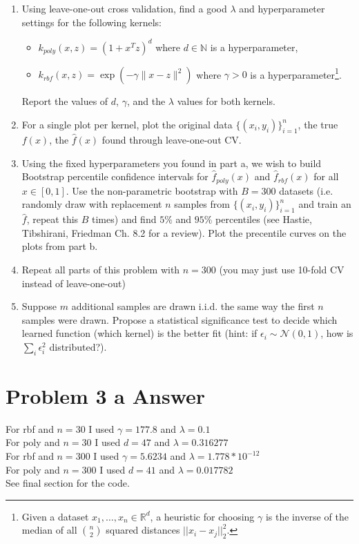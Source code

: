 \documentclass{article}
\newcommand{\field}[1]{\mathbb{#1}}
\newcommand{\1}{\mathbf{1}}
\newcommand{\R}{\field{R}} %
\begin{document}
\begin{enumerate}
  \item Using leave-one-out cross validation, find a good $\lambda$ and hyperparameter settings for the following kernels:
  \begin{itemize}
    \item $k_{poly}(x,z) = (1+x^Tz)^d$ where $d \in \mathbb{N}$ is a hyperparameter, 
    \item $k_{rbf}(x,z) = \exp(-\gamma \|x-z\|^2)$ where $\gamma > 0$ is a hyperparameter\footnote{Given a dataset $x_1,\dots,x_n \in \R^d$, a heuristic for choosing $\gamma$ is the inverse of the median of all $\binom{n}{2}$ squared distances $||x_i-x_j||_2^2$.}.
  \end{itemize} 
Report the values of $d$, $\gamma$, and the $\lambda$ values for both kernels.
  \item For a single plot per kernel, plot the original data $\{(x_i,y_i)\}_{i=1}^n$, the true $f(x)$, the $\widehat{f}(x)$ found through leave-one-out CV.
  \item Using the fixed hyperparameters you found in part a, we wish to build Bootstrap percentile confidence intervals for $\widehat{f}_{poly}(x)$ and $\widehat{f}_{rbf}(x)$ for all $x \in [0,1]$.
  Use the non-parametric bootstrap with $B=300$ datasets (i.e. randomly draw with replacement $n$ samples from $\{(x_i,y_i)\}_{i=1}^n$ and train an $\widehat{f}$, repeat this $B$ times) and find $5\%$ and $95\%$ percentiles (see Hastie, Tibshirani, Friedman Ch. 8.2 for a review). Plot the precentile curves on the plots from part b.
  \item Repeat all parts of this problem with $n=300$ (you may just use 10-fold CV instead of leave-one-out)
  \item Suppose $m$ additional samples are drawn i.i.d. the same way the first $n$ samples were drawn. Propose a statistical significance test to decide which learned function (which kernel) is the better fit (hint: if $\epsilon_i \sim \mathcal{N}(0,1)$, how is $\sum_i \epsilon_i^2$ distributed?).
\end{enumerate}

\newpage

\section*{Problem 3 a Answer}


For rbf and $n=30$ I used $\gamma=177.8$ and $\lambda=0.1$ \\
For poly and $n=30$ I used $d=47$ and $\lambda=0.316277$ \\
For rbf and $n=300$ I used $\gamma=5.6234$ and $\lambda=1.778 * 10^{-12}$ \\
For poly and $n=300$ I used $d=41$ and $\lambda=0.017782$ \\
See final section for the code. 
\end{document}
